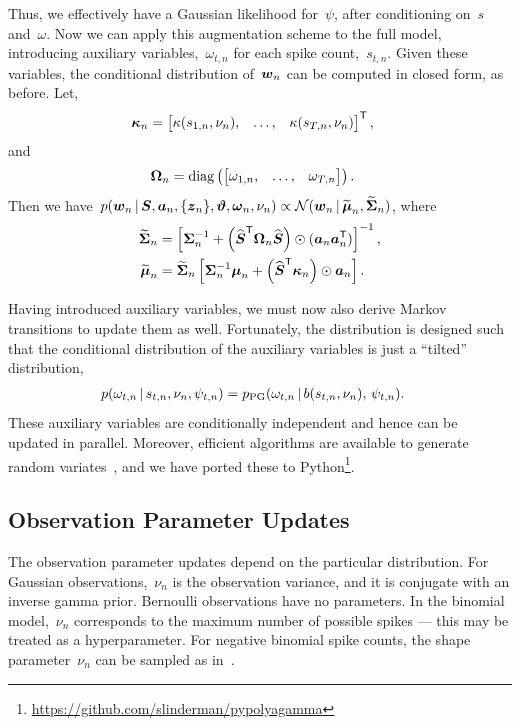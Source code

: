 Thus, we effectively have a Gaussian likelihood for~$\psi$, after conditioning 
on~$s$ and~$\omega$. Now we can apply this augmentation scheme to the full
model, introducing auxiliary variables,~$\omega_{t,n}$ for each spike count,~$s_{t,n}$.
Given these variables, the conditional distribution of~$\boldsymbol{w}_n$ can be computed in closed form,
as before. Let,
\begin{align*}
  \boldsymbol{\kappa}_n
  &= \begin{bmatrix} \kappa(s_{1,n}, \nu_n), &\ldots, &\kappa(s_{T,n}, \nu_n)
  \end{bmatrix}^{\mathsf{T}},
\end{align*}
and
\begin{align*}
  \boldsymbol{\Omega}_n &= \mathrm{diag} \left(
  \begin{bmatrix}
    \omega_{1,n}, & \ldots, & \omega_{T,n}
  \end{bmatrix}
  \right).
\end{align*}
Then we have~$
  p(\boldsymbol{w}_n \,|\, \boldsymbol{S}, \boldsymbol{a}_n, \{\boldsymbol{z}_n\}, \boldsymbol{\vartheta}, \boldsymbol{\omega}_n, \nu_n)
  \propto \mathcal{N}(\boldsymbol{w}_n \,|\, \widetilde{\boldsymbol{\mu}}_n, \widetilde{\boldsymbol{\Sigma}}_n)$,
where
\begin{align*}
  \widetilde{\boldsymbol{\Sigma}}_n &= \left[ \boldsymbol{\Sigma}_n^{-1} +
  \left(\widehat{\boldsymbol{S}}^{\mathsf{T}} \boldsymbol{\Omega}_n \widehat{\boldsymbol{S}} \right) \odot (\boldsymbol{a}_n \boldsymbol{a}_n^{\mathsf{T}}) \right]^{-1}, \\
  \widetilde{\boldsymbol{\mu}}_n &= \widetilde{\boldsymbol{\Sigma}}_n \left[ \boldsymbol{\Sigma}_n^{-1} \boldsymbol{\mu}_n +
  \left(\widehat{\boldsymbol{S}}^{\mathsf{T}} \boldsymbol{\kappa}_n \right) \odot \boldsymbol{a}_n \right].
\end{align*}

Having introduced auxiliary variables, we must now also derive
Markov transitions to update them as well. Fortunately, the
\polyagamma distribution is designed such that the conditional
distribution of the auxiliary variables is just a ``tilted'' \polyagamma
distribution,
\begin{align*}
  p(\omega_{t,n} \,|\, s_{t,n}, \nu_n, \psi_{t,n})
  &= p_{\mathrm{PG}}(\omega_{t,n} \,|\, b(s_{t,n}, \nu_n), \, \psi_{t,n}).
\end{align*}
These auxiliary variables are conditionally independent and hence can
be updated in parallel. Moreover, efficient algorithms are available
to generate \polyagamma random variates~\citep{windle2014sampling}, and
we have ported these to Python\footnote{\url{https://github.com/slinderman/pypolyagamma}}.

\subsection{Observation Parameter Updates}
The observation parameter updates depend on the particular distribution.
For Gaussian observations,~$\nu_n$ is the observation variance, and
it is conjugate with an inverse gamma prior.
Bernoulli observations have no parameters.
In the binomial model,~$\nu_n$ corresponds to the maximum number of
possible spikes --- this may be treated as a hyperparameter.
For negative binomial spike counts, the shape parameter~$\nu_n$ can
be sampled as in~\citep{Zhou2012}.


